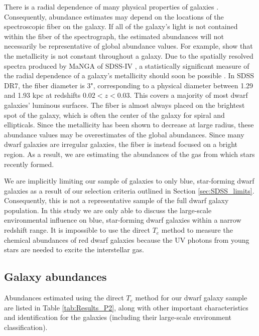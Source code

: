 There is a radial dependence of many physical properties of galaxies 
\citep{Bell00}.  Consequently, abundance estimates may depend on the locations 
of the spectroscopic fiber on the galaxy.  If all of the galaxy's light is not 
contained within the fiber of the spectrograph, the estimated abundances will 
not necessarily be representative of global abundance values.  For example, 
\cite{Bell00} show that the metallicity is not constant throughout a galaxy.  
Due to the spatially resolved spectra produced by MaNGA of SDSS-IV 
\citep{SDSS13}, a statistically significant measure of the radial dependence of 
a galaxy's metallicity should soon be possible \citep{Wilkinson15}.  In SDSS 
DR7, the fiber diameter is 3", corresponding to a physical diameter between 1.29 
and 1.93 kpc at redshifts $0.02 < z < 0.03$.  This covers a majority of most 
dwarf galaxies' luminous surfaces.  The fiber is almost always placed on the 
brightest spot of the galaxy, which is often the center of the galaxy for spiral 
and ellipticals.  Since the metallicity has been shown to decrease at large 
radius, these abundance values may be overestimates of the global abundances.  
Since many dwarf galaxies are irregular galaxies, the fiber is instead focused 
on a bright  region.  As a result, we are estimating the abundances of 
the gas from which stars recently formed.

We are implicitly limiting our sample of galaxies to only blue, star-forming 
dwarf galaxies as a result of our selection criteria outlined in Section 
\ref{sec:SDSS_limits}.  Consequently, this is not a representative sample of the 
full dwarf galaxy population.  In this study we are only able to discuss the 
large-scale environmental influence on blue, star-forming dwarf galaxies within 
a narrow redshift range.  It is impossible to use the direct $T_e$ method to 
measure the chemical abundances of red dwarf galaxies because the UV photons 
from young stars are needed to excite the interstellar gas.


\subsection{Galaxy abundances}

Abundances estimated using the direct $T_e$ method for our dwarf galaxy sample 
are listed in Table \ref{tab:Results_P2}, along with other important 
characteristics and identification for the galaxies (including their large-scale 
environment classification).

